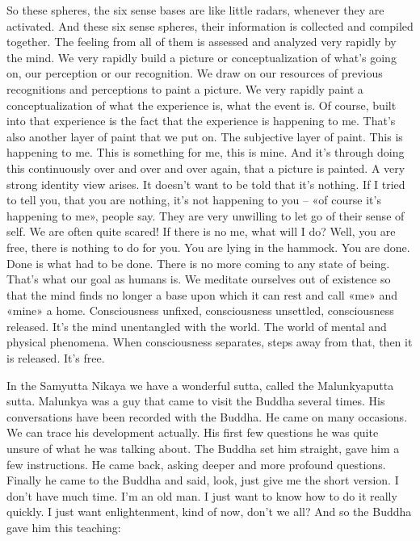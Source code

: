 \documentclass[letterpaper,10pt,english]{sphinxmanual}
\begin{document}
\sphinxAtStartPar
So  these  spheres,  the  six  sense  bases  are  like  little  radars,  whenever
they are activated. And these six sense spheres, their information is collected
and compiled together. The feeling from all of them is assessed and analyzed
very rapidly by the mind. We very rapidly build a picture or conceptualization of what’s going on, our perception or our recognition. We draw on our
resources  of  previous  recognitions  and  perceptions  to  paint  a  picture.  We
  very  rapidly  paint  a  conceptualization  of  what  the  experience  is,  what  the
event is. Of course, built into that experience is the fact that the experience
is happening to me. That’s also another layer of paint that we put on. The
subjective layer of paint. This is happening to me. This is something for me,
this is mine. And it’s through doing this continuously over and over and over
again, that a picture is painted. A very strong identity view arises. It doesn’t
want to be told that it’s nothing. If I tried to tell you, that you are nothing, it’s
not happening to you – «of course it’s happening to me», people say. They
are very unwilling to let go of their sense of self. We are often quite scared!
If there is no me, what will I do? Well, you are free, there is nothing to do
for you. You are lying in the hammock. You are done. Done is what had to
be done. There is no more coming to any state of being. That’s what our goal
as humans is. We meditate ourselves out of existence so that the mind finds
no longer a base upon which it can rest and call «me» and «mine» a home.
Consciousness  unfixed,  consciousness  unsettled,  consciousness  released.
It’s the mind unentangled with the world. The world of mental and physical
phenomena. When consciousness separates, steps away from that, then it is
released. It’s free.

\sphinxAtStartPar
In the Samyutta Nikaya we have a wonderful sutta, called the Malunkyaputta  sutta.  Malunkya  was  a  guy  that  came  to  visit  the  Buddha  several
times. His conversations have been recorded with the Buddha. He came on
many occasions. We can trace his development actually. His first few questions he was quite unsure of what he was talking about. The Buddha set him
straight, gave him a few instructions. He came back, asking deeper and more
profound questions. Finally he came to the Buddha and said, look, just give
me the short version. I don’t have much time. I’m an old man. I just want
to know how to do it really quickly. I just want enlightenment, kind of now,
don’t we all? And so the Buddha gave him this teaching:
\end{document}
